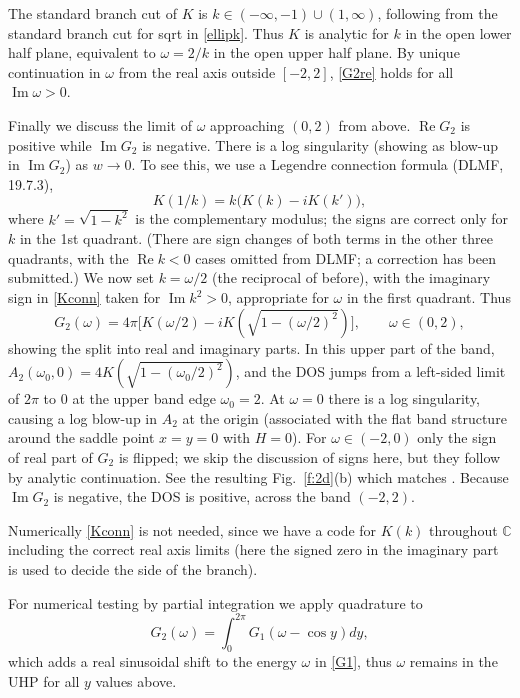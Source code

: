 \documentclass[11pt]{article}
\newcommand{\be}{\begin{equation}}
\newcommand{\ee}{\end{equation}}
\newcommand{\C}{\mathbb{C}}
\DeclareMathOperator{\re}{Re}
\DeclareMathOperator{\im}{Im}
\newcommand{\om}{\omega}
\begin{document}
The standard branch cut of $K$ is $k\in(-\infty,-1)\cup (1,\infty)$,
following from the standard
branch cut for sqrt in \eqref{ellipk}.
Thus $K$ is analytic for $k$ in the open lower half plane,
equivalent to $\om = 2/k$ in the open upper half plane.
By unique continuation in $\om$ from the real axis outside $[-2,2]$,
\eqref{G2re} holds for all $\im \om >0$.

Finally we discuss the limit of $\om$ approaching $(0,2)$ from above.
$\re G_2$ is positive while $\im G_2$ is negative.
There is a log singularity (showing as blow-up in $\im G_2$)
as $w\to 0$.
To see this, we use a Legendre connection formula (DLMF, 19.7.3),
\be
K(1/k) = k\big( K(k) - iK(k') \big),
\label{Kconn}
\ee
where $k'=\sqrt{1-k^2}$ is the complementary modulus; the signs
are correct only for $k$ in the 1st quadrant. (There are
sign changes of both terms in the other three quadrants,
with the $\re k < 0$ cases omitted from DLMF; a correction has been
submitted.)
We now set $k=\om/2$ (the reciprocal of before),
with the imaginary sign in \eqref{Kconn} taken for $\im k^2 > 0$, appropriate
for $\om$ in the first quadrant.
Thus
\[
G_2(\om) = 4\pi \bigl[ K(\om/2) -i K(\sqrt{1-(\om/2)^2}) \bigr],
\qquad \om \in (0,2),
\]
showing the split into real and imaginary parts.
In this upper part of the band, $A_2(\om_0,0) = 4K(\sqrt{1-(\om_0/2)^2})$,
and the DOS jumps from a left-sided limit of $2\pi$ to $0$ at
the upper band edge $\om_0=2$.
At $\om=0$ there is a log singularity, causing a log blow-up
in $A_2$ at the origin (associated with the flat band structure
around the saddle point $x=y=0$ with $H=0$).
For $\om \in (-2,0)$ only the sign of real part of $G_2$ is flipped;
we skip the discussion of signs here, but they follow by analytic
continuation.
See the resulting Fig.~\ref{f:2d}(b) which matches \cite[Fig.~5.7]{economou}.
Because $\im G_2$ is negative, the DOS is positive, across the band $(-2,2)$.

Numerically \eqref{Kconn} is not needed, since we have a code for
$K(k)$ throughout $\C$ including the correct real axis limits
(here the signed zero in the imaginary part is used to decide
the side of the branch).

For numerical testing by partial integration we apply quadrature to
\be
G_2(\om) = \int_{0}^{2\pi} G_1(\om - \cos y) dy,
\ee
which adds a real sinusoidal shift to the energy $\om$ in \eqref{G1},
thus $\om$ remains in the UHP for all $y$ values above.




\end{document}
